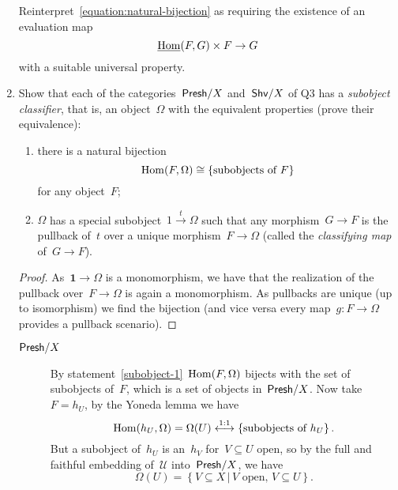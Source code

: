 \documentclass[a4paper,11pt,oneside,openany,article]{memoir}
\begin{document}
\begin{enumerate}
    Reinterpret~\eqref{equation:natural-bijection} as requiring the existence of an evaluation map
    \begin{equation}
      \underline{\operatorname{Hom}}(F,G)\times F\to G
    \end{equation}
    with a suitable universal property.

  \item Show that each of the categories~$\mathsf{Presh}/X$ and~$\mathsf{Shv}/X$ of Q3 has a \emph{subobject classifier}, that is, an object~$\Omega$ with the equivalent properties (prove their equivalence):
    \begin{enumerate}
      \item\label{subobject-1} there is a natural bijection
        \begin{equation}
          \operatorname{Hom}(F,\Omega)\cong\{\text{subobjects of~$F$}\}
        \end{equation}
        for any object~$F$;
      \item\label{subobject-2} $\Omega$ has a special subobject~$\mathrm{1}\overset{t}{\to}\Omega$ such that any morphism~$G\to F$ is the pullback of~$t$ over a unique morphism~$F\to\Omega$ (called the \emph{classifying map} of~$G\to F$).
    \end{enumerate}

    \begin{proof}
      As~$\textbf{1}\to\Omega$ is a monomorphism, we have that the realization of the pullback over~$F\to\Omega$ is again a monomorphism. As pullbacks are unique (up to isomorphism) we find the bijection (and vice versa every map~$g\colon F\to\Omega$ provides a pullback scenario).
    \end{proof}

    \begin{solution}
      \begin{description}
        \item[$\mathsf{Presh}/X$] By statement~\ref{subobject-1}~$\operatorname{Hom}(F,\Omega)$ bijects with the set of subobjects of~$F$, which is a set of objects in~$\mathsf{Presh}/X$. Now take~$F=h_U$, by the Yoneda lemma we have
          \begin{equation}
            \operatorname{Hom}(h_U,\Omega)=\Omega(U)\overset{1:1}{\longleftrightarrow}\left\{ \text{subobjects of~$h_U$} \right\}.
          \end{equation}
          But a subobject of~$h_U$ is an~$h_V$ for~$V\subseteq U$ open, so by the full and faithful embedding of~$\mathcal{U}$ into~$\mathsf{Presh}/X$, we have
          \begin{equation}
            \Omega(U)=\left\{ V\subseteq X\,|\,\text{$V$ open, $V\subseteq U$} \right\}.
          \end{equation}


\end{description}
\end{solution}
\end{enumerate}
\end{document}
